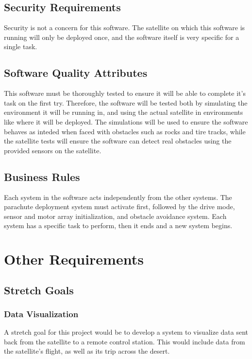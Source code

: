 \documentclass[10pt,onecolumn,draftclsnofoot,document]{IEEEtran}
\begin{document}
\subsection{Security Requirements}
Security is not a concern for this software. The satellite on which this software is running will only be deployed once, and the software itself is very specific for a single task.

\subsection{Software Quality Attributes}
This software must be thoroughly tested to ensure it will be able to complete it's task on the first try. Therefore, the software will be tested both by simulating the environment it will be running in, and using the actual satellite in environments like where it will be deployed. The simulations will be used to ensure the software behaves as inteded when faced with obstacles such as rocks and tire tracks, while the satellite tests will ensure the software can detect real obstacles using the provided sensors on the satellite.

\subsection{Business Rules}
Each system in the software acts independently from the other systems. The parachute deployment system must activate first, followed by the drive mode, sensor and motor array initialization, and obstacle avoidance system. Each system has a specific task to perform, then it ends and a new system begins.

\section{Other Requirements}
\subsection{Stretch Goals}
\subsubsection{Data Visualization}
A stretch goal for this project would be to develop a system to visualize data sent back from the satellite to a remote control station. This would include data from the satellite's flight, as well as its trip across the desert.
\end{document}
